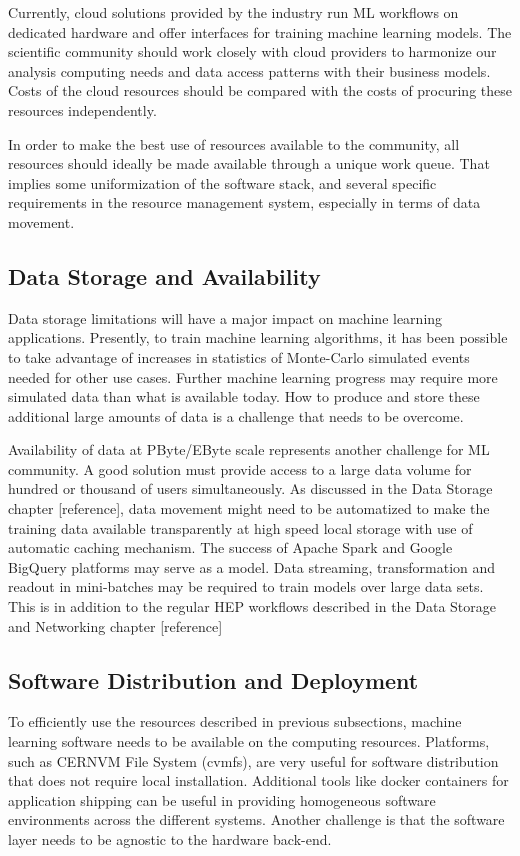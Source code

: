 Currently, cloud solutions provided by the industry run ML workflows on dedicated hardware and offer interfaces for training machine learning models. The scientific community should work closely with cloud providers to harmonize our analysis computing needs and data access patterns with their business models. Costs of the cloud resources should be compared with the costs of procuring these resources independently.

In order to make the best use of resources available to the community, all resources should ideally be made available through a unique work queue. That implies some uniformization of the software stack, and several specific requirements in the resource management system, especially in terms of data movement.

\subsection{Data Storage and Availability}
Data storage limitations will have a major impact on machine learning applications. Presently, to train machine learning algorithms, it has been possible to take advantage of increases in statistics of Monte-Carlo simulated events needed for other use cases. Further machine learning progress may require more simulated data than what is available today. How to produce and store these additional large amounts of data is a challenge that needs to be overcome.

Availability of data at PByte/EByte scale represents another challenge for ML community. A good solution must provide access to a large data volume for hundred or thousand of users simultaneously. As discussed in the Data Storage chapter [reference], data movement might need to be automatized to make the training data available transparently at high speed local storage with use of automatic caching mechanism. The success of Apache Spark and Google BigQuery platforms may serve as a model. Data streaming, transformation and readout in mini-batches may be required to train models over large data sets. This is in addition to the regular HEP workflows described in the Data Storage and Networking chapter [reference]


\subsection{Software Distribution and Deployment}
To efficiently use the resources described in previous subsections, machine learning software needs to be available on the computing resources. Platforms, such as CERNVM File System (cvmfs), are very useful for software distribution that does not require local installation. Additional tools like docker containers for application shipping can be useful in providing homogeneous software environments across the different systems. Another challenge is that the software layer needs to be agnostic to the hardware back-end.

